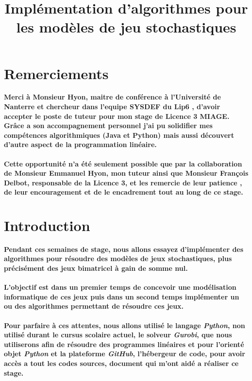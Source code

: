 \documentclass[a4paper, 12pt, twoside]{article}
\title{Implémentation d'algorithmes pour les modèles de jeu stochastiques}
\begin{document}
\pagedegarde

\newpage

\tableofcontents
\newpage
\section*{Remerciements}
\paragraph{Merci à Monsieur Hyon, maitre de conférence à l'Université de Nanterre et chercheur dans l'equipe SYSDEF du Lip6 , d'avoir accepter le poste de tuteur pour mon stage de Licence 3 MIAGE. Grâce a son accompagnement personnel j'ai pu solidifier mes compétences algorithmiques (Java et Python) mais aussi découvert d'autre aspect de la programmation linéaire. }

\paragraph{Cette opportunité n'a été seulement possible que par la collaboration de Monsieur Emmanuel Hyon, mon tuteur ainsi que Monsieur François Delbot, responsable de la Licence 3, et les remercie de leur patience , de leur encouragement et de le encadrement tout au long de ce stage. }
\newpage 
\section{Introduction}
\paragraph{Pendant ces semaines de stage, nous allons essayez d'implémenter des algorithmes pour résoudre des modèles de jeux stochastiques, plus précisément des jeux bimatricel à gain de somme nul.} 
\paragraph{L'objectif est dans un premier temps de concevoir une modélisation informatique de ces jeux puis dans un second temps implémenter un ou des algorithmes permettant de résoudre ces jeux.}
\paragraph{Pour parfaire à ces attentes, nous allons utilisé le langage \textit{Python}, non utilisé durant le cursus scolaire actuel, le solveur \textit{Gurobi}, que nous utiliserons afin de résoudre des programmes linéaires et pour l'orienté objet \textit{Python} et la plateforme \textit{GitHub}, l'hébergeur de code, pour avoir accès a tout les codes sources, document qui m'ont aidé a réaliser ce stage.}
\end{document}
